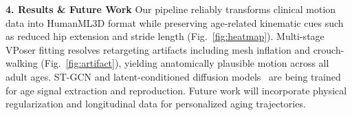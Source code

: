 \textbf{4. Results \& Future Work}
Our pipeline reliably transforms clinical motion data into
HumanML3D format while preserving age-related kinematic
cues such as reduced hip extension and stride length
(Fig.~\ref{fig:heatmap}). Multi-stage VPoser fitting
resolves retargeting artifacts including mesh inflation and
crouch-walking (Fig.~\ref{fig:artifact}), yielding
anatomically plausible motion across all adult ages.
ST-GCN and latent-conditioned diffusion
models~\cite{chen2022mld, hu2022lora, sawdayee2025dance}
are being trained for age signal extraction and
reproduction. Future work will incorporate physical
regularization and longitudinal data for personalized aging
trajectories.